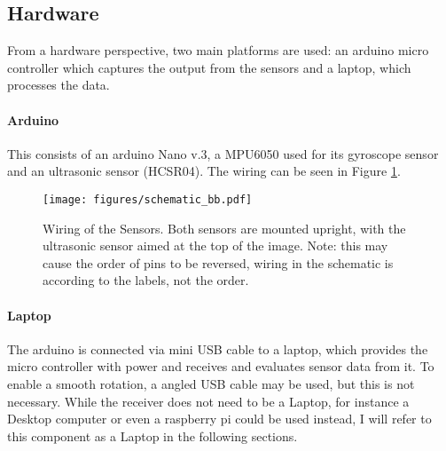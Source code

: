 \subsection{Hardware}
\label{subsec:hardware}

From a hardware perspective, two main platforms are used: an arduino micro controller which captures the output from the sensors and a laptop, which processes the data.

\paragraph{Arduino}
This consists of an arduino Nano v.3, a MPU6050 used for its gyroscope sensor and an ultrasonic sensor (HCSR04). The wiring can be seen in Figure \ref{fig:schematic}.

\begin{figure}
    \centering
    \texttt{[image: figures/schematic\_bb.pdf]}
    \caption{Wiring of the Sensors.
        Both sensors are mounted upright, with the ultrasonic sensor aimed at the top of the image. Note: this may cause the order of pins to be reversed, wiring in the schematic is according to the labels, not the order.}

    \label{fig:schematic}
\end{figure}


\paragraph{Laptop}
The arduino is connected via mini USB cable to a laptop, which provides the micro controller with power and receives and evaluates sensor data from it.
To enable a smooth rotation, a angled USB cable may be used, but this is not necessary.
While the receiver does not need to be a Laptop, for instance a Desktop computer or even a raspberry pi could be used instead, I will refer to this component as a Laptop in the following sections.